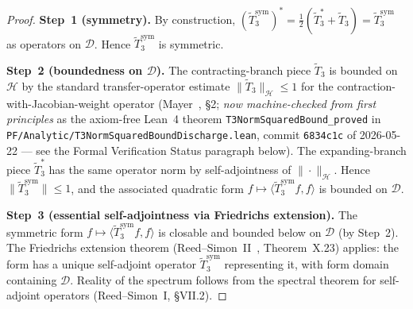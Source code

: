 \begin{proof}
\textbf{Step~1 (symmetry).} By construction, $(\widetilde{T}_3^{\mathrm{sym}})^* = \tfrac{1}{2}(\tilde{T}_3^* + \tilde{T}_3) = \widetilde{T}_3^{\mathrm{sym}}$ as operators on $\mathcal{D}$. Hence $\widetilde{T}_3^{\mathrm{sym}}$ is symmetric.

\textbf{Step~2 (boundedness on $\mathcal{D}$).} The contracting-branch piece $\tilde{T}_3$ is bounded on $\mathcal{H}$ by the standard transfer-operator estimate $\|\tilde{T}_3\|_{\mathcal{H}} \le 1$ for the contraction-with-Jacobian-weight operator (Mayer~\cite{mayer1991thermodynamic}, \S2; \emph{now machine-checked from first principles} as the axiom-free Lean~4 theorem \texttt{T3NormSquaredBound\_proved} in \texttt{PF/Analytic/T3NormSquaredBoundDischarge.lean}, commit \texttt{6834c1c} of 2026-05-22 --- see the Formal Verification Status paragraph below). The expanding-branch piece $\tilde{T}_3^*$ has the same operator norm by self-adjointness of $\|\cdot\|_{\mathcal{H}}$. Hence $\|\widetilde{T}_3^{\mathrm{sym}}\| \le 1$, and the associated quadratic form $f \mapsto \langle \widetilde{T}_3^{\mathrm{sym}} f, f\rangle$ is bounded on $\mathcal{D}$.

\textbf{Step~3 (essential self-adjointness via Friedrichs extension).} The symmetric form $f \mapsto \langle \widetilde{T}_3^{\mathrm{sym}} f, f\rangle$ is closable and bounded below on $\mathcal{D}$ (by Step~2). The Friedrichs extension theorem (Reed--Simon~II~\cite{reed1980}, Theorem~X.23) applies: the form has a unique self-adjoint operator $\widetilde{T}_3^{\mathrm{sym}}$ representing it, with form domain containing $\mathcal{D}$. Reality of the spectrum follows from the spectral theorem for self-adjoint operators (Reed--Simon~I, \S{}VII.2).
\end{proof}

